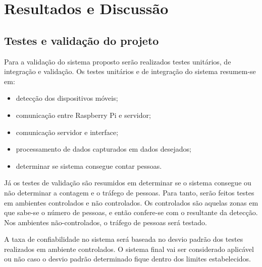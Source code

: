 \chapter{Resultados e Discussão}
\label{resultados-discussao}


\section{Testes e validação do projeto}
Para a validação do sistema proposto serão realizados testes unitários, de integração e
validação. Os testes unitários e de integração do sistema resumem-se em:

\begin{itemize}
  \item detecção dos dispositivos móveis;
  \item comunicação entre Raspberry Pi e servidor;
  \item comunicação servidor e interface;
  \item processamento de dados capturados em dados desejados;
  \item determinar se sistema consegue contar pessoas.
\end{itemize}

Já os testes de validação são resumidos em determinar se o sistema consegue ou
não determinar a contagem e o tráfego de pessoas. Para tanto, serão feitos testes em
ambientes controlados e não controlados. Os controlados são
aquelas zonas em que sabe-se o número de pessoas, e então confere-se com o resultante da
detecção. Nos ambientes não-controlados, o tráfego de pessoas será testado.

A taxa de confiabilidade no sistema será baseada no desvio padrão dos testes
realizados em ambiente controlados.
O sistema final vai ser considerado aplicável ou não caso o desvio
padrão determinado fique dentro
dos limites estabelecidos.


